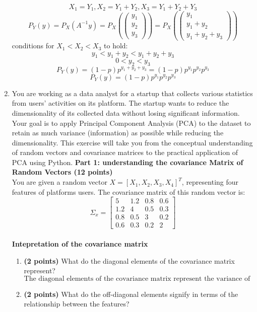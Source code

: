 \documentclass[a3paper,12pt]{extarticle} %
\begin{document}
\begin{enumerate}
\[    \]
    \[
    X_1 = Y_1, X_2 = Y_1 + Y_2, X_3 = Y_1 + Y_2 + Y_3
    \]
    \[
    P_Y(y) = P_X(A^{-1}y) = P_X\left(\begin{pmatrix}y_1\\y_2 \\y_3\end{pmatrix}\right) = P_X\left(\begin{pmatrix}y_1\\y_1 + y_2 \\y_1 + y_2 + y_3\end{pmatrix}\right)
    \]
    conditions for \(X_1 < X_2 < X_3\) to hold:
    \[
    y_1 < y_1 + y_2 < y_1 + y_2 + y_3
    \]
    \[
    0 < y_2 < y_3
    \]
    \[
    P_Y(y) = (1-p)p^{y_1 + y_2 + y_3} = (1-p)p^{y_1}p^{y_2}p^{y_3}
    \]
    \[
    P_Y(y) = (1-p)p^{y_1}p^{y_2}p^{y_3}
    \]
    \item You are working as a data analyst for a startup that collects various statistics from users’ activities
    on its platform. The startup wants to reduce the dimensionality of its collected data without
    losing significant information. Your goal is to apply Principal Component Analysis (PCA) to the
    dataset to retain as much variance (information) as possible while reducing the dimensionality.
    This exercise will take you from the conceptual understanding of random vectors and covariance
    matrices to the practical application of PCA using Python.
    \subitem \textbf{Part 1: understanding the covariance Matrix of Random Vectors (12 points)}
    \\ You are given a random vector \(X = [X_1, X_2, X_3, X_4]^{T}\), representing four features of platforms users. The covariance matrix of this random vector is:
    \[
    \Sigma_x = \begin{bmatrix}5 & 1.2 & 0.8 & 0.6\\1.2 & 4 & 0.5 & 0.3\\0.8 & 0.5 & 3 & 0.2\\0.6 & 0.3 & 0.2 & 2\end{bmatrix}
    \]
    \\ \subitem \textbf{Intepretation of the covariance matrix}
    \begin{enumerate}
        \item \textbf{(2 points)} What do the diagonal elements of the covariance matrix represent?
        \[
            \text{The diagonal elements of the covariance matrix represent the variance of the individual features.}
        \]
        \item \textbf{(2 points)} What do the off-diagonal elements signify in terms of the relationship between the features?

\end{enumerate}
\end{enumerate}
\end{document}
